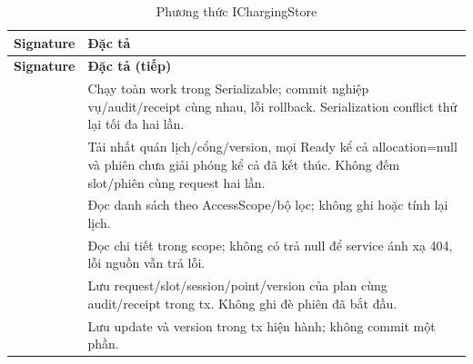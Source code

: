 \begin{longtable}{|L{58mm}|L{81mm}|}
\caption{Phương thức IChargingStore}\\\hline
\textbf{Signature} & \textbf{Đặc tả}\\\hline
\endfirsthead
\hline\textbf{Signature} & \textbf{Đặc tả (tiếp)}\\\hline\endhead
{} & Chạy toàn work trong Serializable; commit nghiệp vụ/audit/receipt cùng nhau, lỗi rollback. Serialization conflict thử lại tối đa hai lần.\\\hline
{} & Tải nhất quán lịch/cổng/version, mọi Ready kể cả allocation=null và phiên chưa giải phóng kể cả đã kết thúc. Không đếm slot/phiên cùng request hai lần.\\\hline
{} & Đọc danh sách theo AccessScope/bộ lọc; không ghi hoặc tính lại lịch.\\\hline
{} & Đọc chi tiết trong scope; không có trả null để service ánh xạ 404, lỗi nguồn vẫn trả lỗi.\\\hline
{} & Lưu request/slot/session/point/version của plan cùng audit/receipt trong tx. Không ghi đè phiên đã bắt đầu.\\\hline
{} & Lưu update và version trong tx hiện hành; không commit một phần.\\\hline
\end{longtable}



